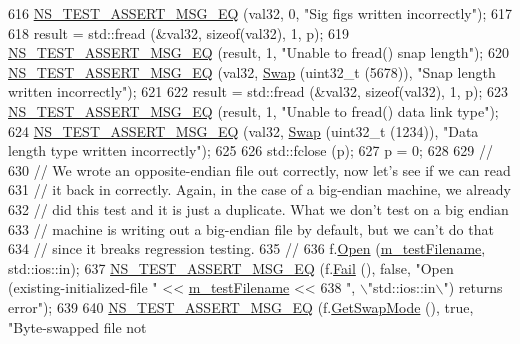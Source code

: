 \begin{DoxyCode}
616   \hyperlink{group__testing_ga2a9d78cffb3db8e867c35fff0b698cf5}{NS\_TEST\_ASSERT\_MSG\_EQ} (val32, 0, \textcolor{stringliteral}{"Sig figs written incorrectly"});
617 
618   result = std::fread (&val32, \textcolor{keyword}{sizeof}(val32), 1, p);
619   \hyperlink{group__testing_ga2a9d78cffb3db8e867c35fff0b698cf5}{NS\_TEST\_ASSERT\_MSG\_EQ} (result, 1, \textcolor{stringliteral}{"Unable to fread() snap length"});
620   \hyperlink{group__testing_ga2a9d78cffb3db8e867c35fff0b698cf5}{NS\_TEST\_ASSERT\_MSG\_EQ} (val32, \hyperlink{pcap-file-test-suite_8cc_a9baeceaeb66adfc7bddae33a81ad8fa7}{Swap} (uint32\_t (5678)), \textcolor{stringliteral}{"Snap length written
       incorrectly"});
621 
622   result = std::fread (&val32, \textcolor{keyword}{sizeof}(val32), 1, p);
623   \hyperlink{group__testing_ga2a9d78cffb3db8e867c35fff0b698cf5}{NS\_TEST\_ASSERT\_MSG\_EQ} (result, 1, \textcolor{stringliteral}{"Unable to fread() data link type"});
624   \hyperlink{group__testing_ga2a9d78cffb3db8e867c35fff0b698cf5}{NS\_TEST\_ASSERT\_MSG\_EQ} (val32, \hyperlink{pcap-file-test-suite_8cc_a9baeceaeb66adfc7bddae33a81ad8fa7}{Swap} (uint32\_t (1234)), \textcolor{stringliteral}{"Data length type written
       incorrectly"});
625 
626   std::fclose (p);
627   p = 0;
628 
629   \textcolor{comment}{//}
630   \textcolor{comment}{// We wrote an opposite-endian file out correctly, now let's see if we can read}
631   \textcolor{comment}{// it back in correctly.  Again, in the case of a big-endian machine, we already}
632   \textcolor{comment}{// did this test and it is just a duplicate.  What we don't test on a big endian}
633   \textcolor{comment}{// machine is writing out a big-endian file by default, but we can't do that }
634   \textcolor{comment}{// since it breaks regression testing.}
635   \textcolor{comment}{//}
636   f.\hyperlink{classns3_1_1PcapFile_a064e8494e28e823d0bb4e40549f9f483}{Open} (\hyperlink{classFileHeaderTestCase_a4ab3078ae75680fcc90a3eca9f273cd2}{m\_testFilename}, std::ios::in);
637   \hyperlink{group__testing_ga2a9d78cffb3db8e867c35fff0b698cf5}{NS\_TEST\_ASSERT\_MSG\_EQ} (f.\hyperlink{classns3_1_1PcapFile_a2e00aa080890a0c9c3e9f5bd2d6c21d5}{Fail} (), \textcolor{keyword}{false}, \textcolor{stringliteral}{"Open (existing-initialized-file "} << 
      \hyperlink{classFileHeaderTestCase_a4ab3078ae75680fcc90a3eca9f273cd2}{m\_testFilename} << 
638                          \textcolor{stringliteral}{", \(\backslash\)"std::ios::in\(\backslash\)") returns error"});
639 
640   \hyperlink{group__testing_ga2a9d78cffb3db8e867c35fff0b698cf5}{NS\_TEST\_ASSERT\_MSG\_EQ} (f.\hyperlink{classns3_1_1PcapFile_af4e258052b9350be97672eb30f3428c2}{GetSwapMode} (), \textcolor{keyword}{true}, \textcolor{stringliteral}{"Byte-swapped file not
}
\end{DoxyCode}
